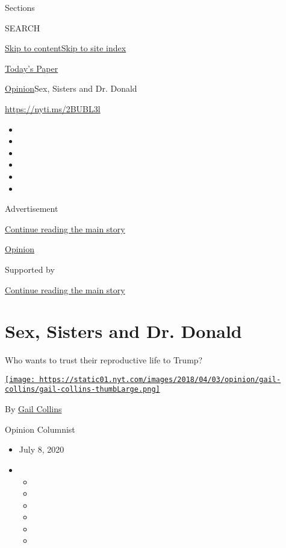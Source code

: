 Sections

SEARCH

\protect\hyperlink{site-content}{Skip to
content}\protect\hyperlink{site-index}{Skip to site index}

\href{https://myaccount.nytimes.com/auth/login?response_type=cookie\&client_id=vi}{}

\href{https://www.nytimes.com/section/todayspaper}{Today's Paper}

\href{/section/opinion}{Opinion}\textbar{}Sex, Sisters and Dr. Donald

\href{https://nyti.ms/2BUBL3l}{https://nyti.ms/2BUBL3l}

\begin{itemize}
\item
\item
\item
\item
\item
\item
\end{itemize}

Advertisement

\protect\hyperlink{after-top}{Continue reading the main story}

\href{/section/opinion}{Opinion}

Supported by

\protect\hyperlink{after-sponsor}{Continue reading the main story}

\hypertarget{sex-sisters-and-dr-donald}{%
\section{Sex, Sisters and Dr. Donald}\label{sex-sisters-and-dr-donald}}

Who wants to trust their reproductive life to Trump?

\href{https://www.nytimes.com/by/gail-collins}{\texttt{[image: https://static01.nyt.com/images/2018/04/03/opinion/gail-collins/gail-collins-thumbLarge.png]}}

By \href{https://www.nytimes.com/by/gail-collins}{Gail Collins}

Opinion Columnist

\begin{itemize}
\item
  July 8, 2020
\item
  \begin{itemize}
  \item
  \item
  \item
  \item
  \item
  \item
  \end{itemize}
\end{itemize}

